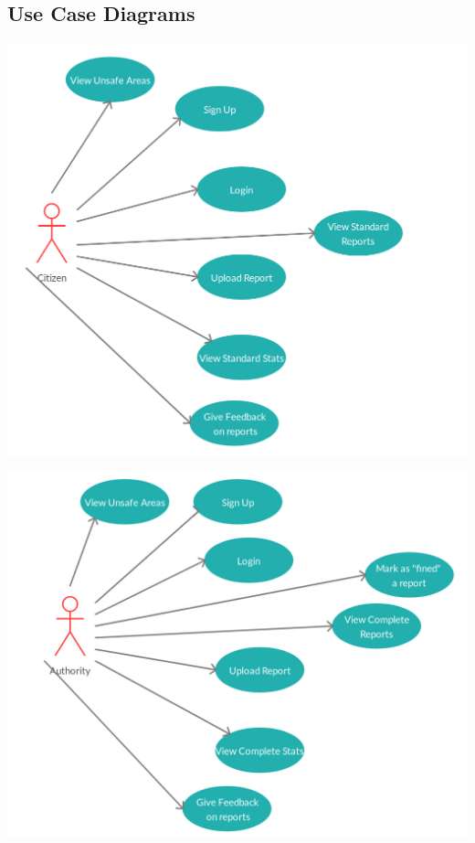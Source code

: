\documentclass[../RASD.tex]{subfiles}
\begin{document}
            \subsection{Use Case Diagrams}\label{subsec:Use-case-diagram}
                \begin{center}
                    \includegraphics[scale = 1]{assets/citizenUC.png}\\[1.6 cm]
                \end{center}
                \begin{center}
                    \includegraphics[scale = 1]{assets/authorityUC.png}\\[1.6 cm]
                \end{center}
\end{document}

